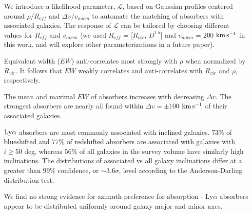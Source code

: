 \documentclass[twocolumn,tighten]{aastex6}
\begin{document}
\vspace{10pt}

\indent \textbullet \indent We introduce a likelihood parameter, $\mathcal{L}$, based on Gaussian profiles centered around $\rho / R_{eff}$ and $\Delta v / v_{norm}$ to automate the matching of absorbers with associated galaxies. The response of $\mathcal{L}$ can be tailored by choosing different values for $R_{eff}$ and $v_{norm}$ (we used $R_{eff}$ = [$R_{vir}$, $D^{1.5}$] and $v_{norm}$ = 200 $\rm km\, s^{-1}$ in this work, and will explore other parameterizations in a future paper).

\vspace{10pt}

\indent \textbullet \indent Equivalent width ($EW$) anti-correlates most strongly with $\rho$ when normalized by $R_{vir}$. It follows that $EW$ weakly correlates and anti-correlates with $R_{vir}$ and $\rho$, respectively.

\vspace{10pt}

\indent \textbullet \indent The mean and maximal $EW$ of absorbers increases with decreasing $\Delta v$. The strongest absorbers are nearly all found within $\Delta v = \pm 100$ $\rm km\, s^{-1}$ of their associated galaxies.

\vspace{10pt}



\textbullet \indent $\rm Ly\alpha$ absorbers are most commonly associated with inclined galaxies. $73\%$ of blueshifted and $77\%$ of redshifted absorbers are associated with galaxies with $i \geq 50$ deg, whereas $56\%$ of all galaxies in the survey volume have similarly high inclinations. The distributions of associated vs all galaxy inclinations differ at a greater than $99\%$ confidence, or $\sim 3.6\sigma$, level according to the Anderson-Darling distribution test.

\vspace{10pt}

\indent \textbullet \indent We find no strong evidence for azimuth preference for absorption - Ly$\alpha$ absorbers appear to be distributed uniformly around galaxy major and minor axes.
\end{document}
